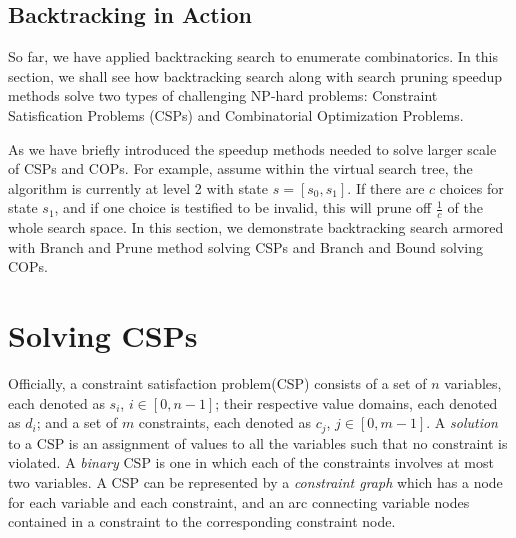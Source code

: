 \documentclass[../main.tex]{subfiles}
\begin{document}
 

\subsection{Backtracking in Action}
So far, we have applied backtracking search to enumerate combinatorics. In this section, we shall see how  backtracking search along with search pruning speedup methods solve two types of challenging NP-hard problems: Constraint Satisfication Problems (CSPs) and Combinatorial Optimization Problems. 

As we have briefly introduced the speedup methods needed to solve larger scale of CSPs and COPs. For example, assume within the virtual search tree, the algorithm is currently at level 2 with state $s=[s_0, s_1]$. If there are $c$ choices for state $s_1$, and if one choice is testified to be invalid, this will prune off $\frac{1}{c}$ of the whole search space. In this section, we demonstrate backtracking search armored with Branch and Prune method solving CSPs and Branch and Bound solving COPs.


\section{Solving CSPs}
Officially, a constraint satisfaction problem(CSP) consists of a set of $n$ variables, each denoted as $s_i$, $i\in[0, n-1]$; their respective value domains,  each denoted as $d_i$; and a set of $m$ constraints, each denoted as $c_j$, $j \in [0, m-1]$. A \textit{solution} to a CSP is an assignment of values to all the variables such that no constraint is violated. A \textit{binary} CSP is one in which each of the constraints involves at most two variables. A CSP can be represented by a \textit{constraint graph} which has a node for each variable and each constraint, and an arc connecting variable nodes contained in a constraint to the corresponding constraint node.
\end{document}
